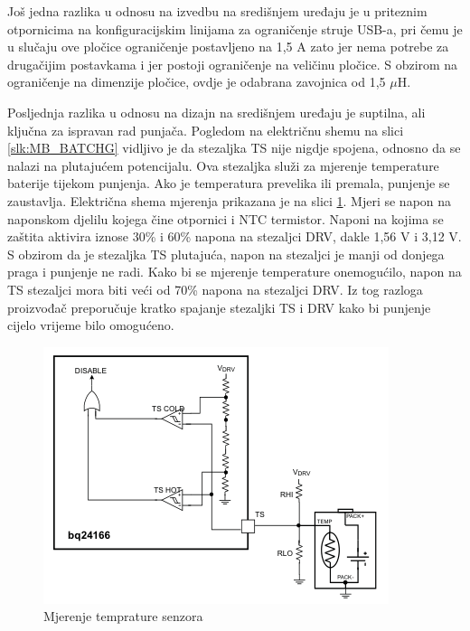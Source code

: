 Još jedna razlika u odnosu na izvedbu na središnjem uređaju je u priteznim otpornicima na konfiguracijskim linijama za ograničenje struje USB-a, pri čemu je u slučaju ove pločice ograničenje postavljeno na 1,5 A zato jer nema potrebe za drugačijim postavkama i jer postoji ograničenje na veličinu pločice. S obzirom na ograničenje na dimenzije pločice, ovdje je odabrana zavojnica od 1,5 $\mu \textrm{H}$.

Posljednja razlika u odnosu na dizajn na središnjem uređaju je suptilna, ali ključna za ispravan rad punjača. Pogledom na električnu shemu na slici \ref{slk:MB_BATCHG} vidljivo je da stezaljka TS nije nigdje spojena, odnosno da se nalazi na plutajućem potencijalu. Ova stezaljka služi za mjerenje temperature baterije tijekom punjenja. Ako je temperatura prevelika ili premala, punjenje se zaustavlja. Električna shema mjerenja prikazana je na slici \ref{slk:BATCHG_TS}. Mjeri se napon na naponskom djelilu kojega čine otpornici i NTC termistor. Naponi na kojima se zaštita aktivira iznose 30\% i 60\% napona na stezaljci DRV, dakle 1,56 V i 3,12 V. S obzirom da je stezaljka TS plutajuća, napon na stezaljci je manji od donjega praga i punjenje ne radi. Kako bi se mjerenje temperature onemogućilo, napon na TS stezaljci mora biti veći od 70\% napona na stezaljci DRV. Iz tog razloga proizvođač preporučuje kratko spajanje stezaljki TS i DRV kako bi punjenje cijelo vrijeme bilo omogućeno.
\begin{figure}[htb]
    \centering
    \includegraphics[width=10 cm]{Figures/BATCHG_TS.png}
    \caption{Mjerenje temprature senzora}
    \label{slk:BATCHG_TS}
\end{figure}

